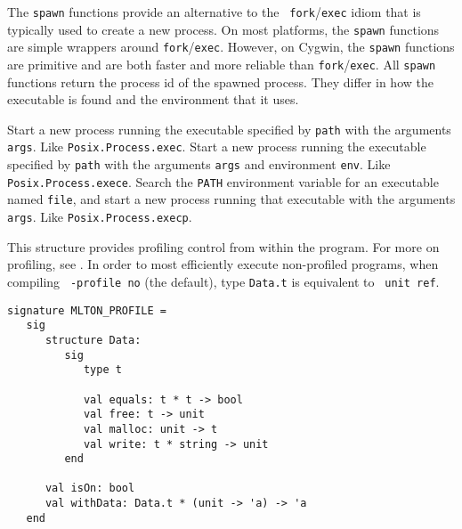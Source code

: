 The {\tt spawn} functions provide an alternative to the {\tt
fork}/{\tt exec} idiom that is typically used to create a new process.
On most platforms, the {\tt spawn} functions are simple wrappers
around {\tt fork}/{\tt exec}.  However, on Cygwin, the {\tt spawn}
functions are primitive and are both faster and more reliable than
{\tt fork}/{\tt exec}.  All {\tt spawn} functions return the process
id of the spawned process.  They differ in how the executable is found
and the environment that it uses.

\begin{description}
Start a new process running the executable specified by {\tt path} with the
arguments {\tt args}.  Like {\tt Posix.Process.exec}.
Start a new process running the executable specified by {\tt path} with the
arguments {\tt args} and environment {\tt env}.  Like {\tt Posix.Process.exece}.
Search the {\tt PATH} environment variable for an executable named {\tt file},
and start a new process running that executable with the arguments {\tt args}.
Like {\tt Posix.Process.execp}.
\end{description}


This structure provides profiling control from within the program.
For more on profiling, see .  In order to most
efficiently execute non-profiled programs, when compiling {\tt
-profile no} (the default), type {\tt Data.t} is equivalent to {\tt
unit ref}.

\begin{verbatim}
signature MLTON_PROFILE =
   sig
      structure Data:
         sig
            type t

            val equals: t * t -> bool
            val free: t -> unit
            val malloc: unit -> t
            val write: t * string -> unit
         end

      val isOn: bool
      val withData: Data.t * (unit -> 'a) -> 'a
   end
\end{verbatim}

